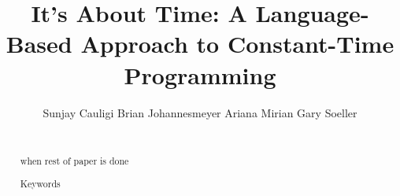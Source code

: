 \documentclass{sig-alternate-10pt}
\newcommand{\tk}{{\color{red}{\bf TK}}\xspace}
\newcommand{\TK}{\tk}
\begin{document}
\title{It's About Time: A Language-Based Approach to Constant-Time Programming}

\author{
\alignauthor%
Sunjay Cauligi\qquad
Brian Johannesmeyer\qquad
Ariana Mirian\qquad
Gary Soeller\qquad
\smallskip\\\\%
}

\maketitle
\thispagestyle{empty}

\newcommand{\update}[1]{{\color{blue}#1}\xspace}

\newcommand{\twolinecell}[2][r]{%
  \begin{tabular}[#1]{@{}c@{}}#2\end{tabular}}



\pagestyle{plain}
\thispagestyle{empty}

\begin{abstract}
\TK when rest of paper is done

\begin{keywords}
Keywords
\end{keywords}
\end{abstract}











\end{document}
